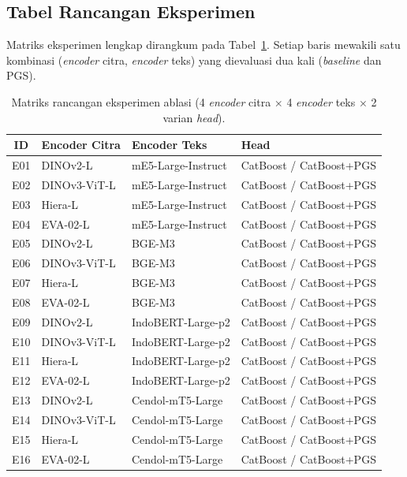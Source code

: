 \subsection{Tabel Rancangan Eksperimen}

Matriks eksperimen lengkap dirangkum pada Tabel~\ref{tab:matrix-eksperimen}. Setiap baris mewakili satu kombinasi (\textit{encoder} citra, \textit{encoder} teks) yang dievaluasi dua kali (\textit{baseline} dan PGS).

\begin{table}[htbp]
\centering
\caption{Matriks rancangan eksperimen ablasi (4 \textit{encoder} citra \(\times\) 4 \textit{encoder} teks \(\times\) 2 varian \textit{head}).}
\label{tab:matrix-eksperimen}
\small
\begin{tabular}{c p{3.2cm} p{4.0cm} p{3.2cm}}
\toprule
\textbf{ID} & \textbf{Encoder Citra} & \textbf{Encoder Teks} & \textbf{Head} \\
\midrule
E01 & DINOv2-L & mE5-Large-Instruct & CatBoost / CatBoost+PGS \\
E02 & DINOv3-ViT-L & mE5-Large-Instruct & CatBoost / CatBoost+PGS \\
E03 & Hiera-L & mE5-Large-Instruct & CatBoost / CatBoost+PGS \\
E04 & EVA-02-L & mE5-Large-Instruct & CatBoost / CatBoost+PGS \\
E05 & DINOv2-L & BGE-M3 & CatBoost / CatBoost+PGS \\
E06 & DINOv3-ViT-L & BGE-M3 & CatBoost / CatBoost+PGS \\
E07 & Hiera-L & BGE-M3 & CatBoost / CatBoost+PGS \\
E08 & EVA-02-L & BGE-M3 & CatBoost / CatBoost+PGS \\
E09 & DINOv2-L & IndoBERT-Large-p2 & CatBoost / CatBoost+PGS \\
E10 & DINOv3-ViT-L & IndoBERT-Large-p2 & CatBoost / CatBoost+PGS \\
E11 & Hiera-L & IndoBERT-Large-p2 & CatBoost / CatBoost+PGS \\
E12 & EVA-02-L & IndoBERT-Large-p2 & CatBoost / CatBoost+PGS \\
E13 & DINOv2-L & Cendol-mT5-Large & CatBoost / CatBoost+PGS \\
E14 & DINOv3-ViT-L & Cendol-mT5-Large & CatBoost / CatBoost+PGS \\
E15 & Hiera-L & Cendol-mT5-Large & CatBoost / CatBoost+PGS \\
E16 & EVA-02-L & Cendol-mT5-Large & CatBoost / CatBoost+PGS \\
\bottomrule
\end{tabular}
\end{table}

